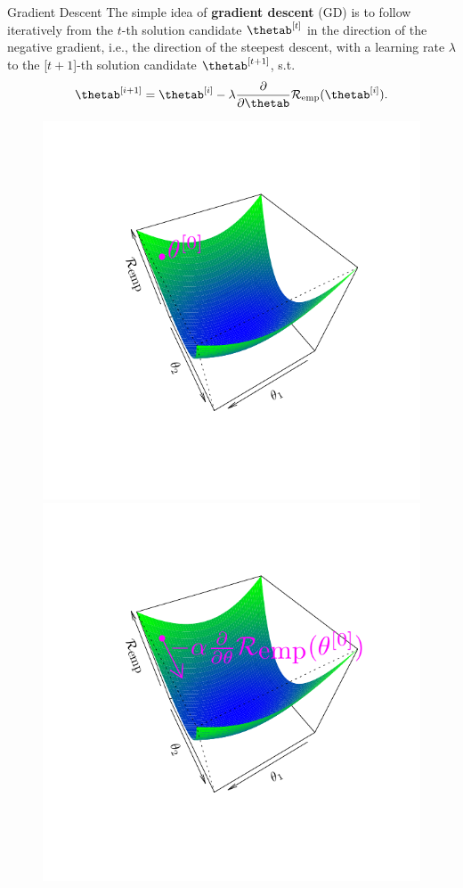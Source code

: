 \documentclass[11pt,compress,t,notes=noshow, xcolor=table]{beamer}
\begin{document}
\begin{vbframe}{Gradient Descent}
    The simple idea of \textbf{gradient descent} (GD) is to follow iteratively from the $t$-th solution candidate $\thetab^{[t]}$ in the direction of the negative gradient, i.e., the direction of the steepest descent, with a learning rate $\lambda$ to the [$t+1$]-th solution candidate $\thetab^{[t+1]}$, s.t.
\[
    \thetab^{[i+1]} = \thetab^{[i]} - \lambda \frac{\partial}{\partial\thetab}{\riske(\thetab^{[i]})}.
\]

\begin{figure}[!htb]
  \includegraphics[trim=2cm 2cm 2cm 2cm, width=\linewidth]{figure/grad_desc1}  
\endminipage\hfill
{}
  \includegraphics[trim=2cm 2cm 2cm 2cm, width=\linewidth]{figure/grad_desc2}

\end{figure}
\end{vbframe}
\end{document}
